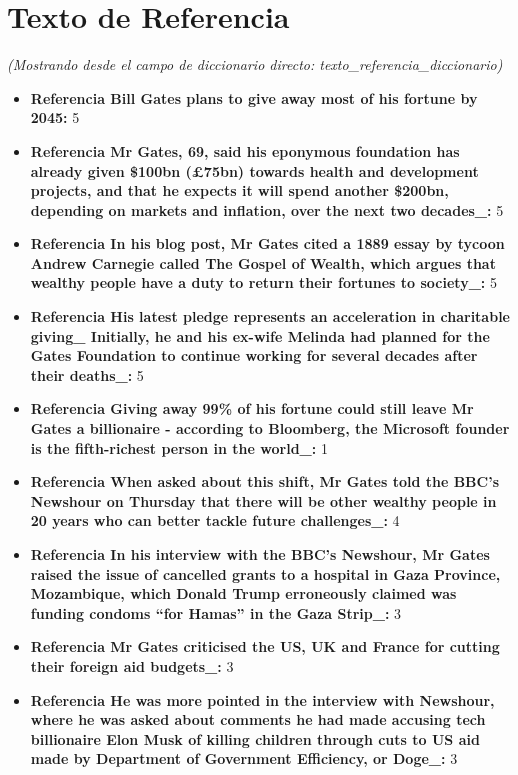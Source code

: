 \documentclass[10pt,a4paper]{article}
\begin{document}
\section*{Texto de Referencia}
    \textit{(Mostrando desde el campo de diccionario directo: texto\_referencia\_diccionario)}
    \begin{itemize}[leftmargin=*]
            \item \textbf{Referencia Bill Gates plans to give away most of his fortune by 2045:} 5
            \item \textbf{Referencia Mr Gates, 69, said his eponymous foundation has already given \$100bn (£75bn) towards health and development projects, and that he expects it will spend another \$200bn, depending on markets and inflation, over the next two decades\_:} 5
            \item \textbf{Referencia In his blog post, Mr Gates cited a 1889 essay by tycoon Andrew Carnegie called The Gospel of Wealth, which argues that wealthy people have a duty to return their fortunes to society\_:} 5
            \item \textbf{Referencia His latest pledge represents an acceleration in charitable giving\_ Initially, he and his ex-wife Melinda had planned for the Gates Foundation to continue working for several decades after their deaths\_:} 5
            \item \textbf{Referencia Giving away 99\% of his fortune could still leave Mr Gates a billionaire - according to Bloomberg, the Microsoft founder is the fifth-richest person in the world\_:} 1
            \item \textbf{Referencia When asked about this shift, Mr Gates told the BBC's Newshour on Thursday that there will be other wealthy people in 20 years who can better tackle future challenges\_:} 4
            \item \textbf{Referencia In his interview with the BBC's Newshour, Mr Gates raised the issue of cancelled grants to a hospital in Gaza Province, Mozambique, which Donald Trump erroneously claimed was funding condoms ``for Hamas'' in the Gaza Strip\_:} 3
            \item \textbf{Referencia Mr Gates criticised the US, UK and France for cutting their foreign aid budgets\_:} 3
            \item \textbf{Referencia He was more pointed in the interview with Newshour, where he was asked about comments he had made accusing tech billionaire Elon Musk of killing children through cuts to US aid made by Department of Government Efficiency, or Doge\_:} 3
    \end{itemize}
\vspace{1em}
\end{document}
